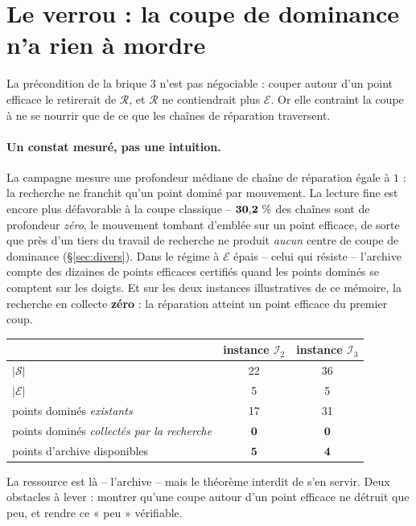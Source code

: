 \documentclass[11pt,a4paper]{article}
\theoremstyle{plain}
\theoremstyle{remark}
\newcommand{\Ecal}{\mathcal{E}}
\newcommand{\Scal}{\mathcal{S}}
\newcommand{\Rcal}{\mathcal{R}}
\begin{document}
\section{Le verrou : la coupe de dominance n'a rien à mordre}
\label{sec:verrou}

La précondition de la brique 3 n'est pas négociable : couper autour d'un
point efficace le retirerait de $\Rcal$, et $\Rcal$ ne contiendrait plus
$\Ecal$. Or elle contraint la coupe à ne se nourrir que de ce que les
chaînes de réparation traversent.

\paragraph{Un constat mesuré, pas une intuition.} La campagne mesure une
profondeur médiane de chaîne de réparation égale à $1$ : la recherche ne
franchit qu'un point dominé par mouvement. La lecture fine est encore plus
défavorable à la coupe classique -- $\mathbf{30{,}2{}\ \%}$ des chaînes sont
de profondeur \emph{zéro}, le mouvement tombant d'emblée sur un point
efficace, de sorte que près d'un tiers du travail de recherche ne produit
\emph{aucun} centre de coupe de dominance (§\ref{sec:divers}). Dans le régime à $\Ecal$ épais --
celui qui résiste -- l'archive compte des dizaines de points efficaces
certifiés quand les points dominés se comptent sur les doigts. Et sur les
deux instances illustratives de ce mémoire, la recherche en collecte
\textbf{zéro} : la réparation atteint un point efficace du premier coup.

\begin{center}
\begin{tabular}{lcc}
\toprule
& instance $\mathcal{I}_2$ & instance $\mathcal{I}_3$\\
\midrule
$|\Scal|$ & 22 & 36\\
$|\Ecal|$ & 5 & 5\\
points dominés \emph{existants} & 17 & 31\\
points dominés \emph{collectés par la recherche} & $\mathbf{0}$ & $\mathbf{0}$\\
points d'archive disponibles & $\mathbf{5}$ & $\mathbf{4}$\\
\bottomrule
\end{tabular}
\end{center}

\smallskip\noindent
La ressource est là -- l'archive -- mais le théorème interdit de s'en servir.
Deux obstacles à lever : montrer qu'une coupe autour d'un point efficace ne
détruit que peu, et rendre ce « peu » vérifiable.
\end{document}
